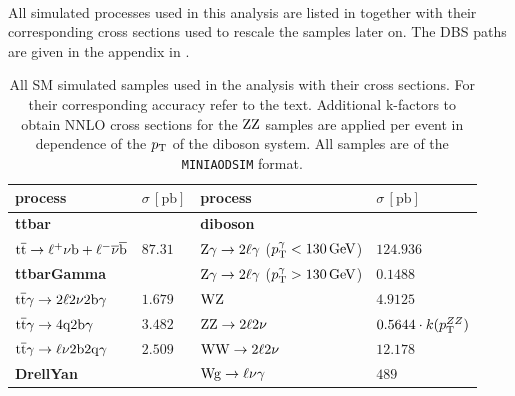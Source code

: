 \\
All simulated processes used in this analysis are listed in  together with their corresponding cross sections used to rescale the samples later on. The DBS paths are given in the appendix in .\\

\begin{table}[htb]
 \centering
 \caption{All SM simulated samples used in the analysis with their cross sections. For their corresponding accuracy refer to the text. Additional k-factors to obtain NNLO cross sections for the $\mathrm{Z}\mathrm{Z}$ samples are applied per event in dependence of the $p_{\mathrm{T}}$ of the diboson system. All samples are of the \texttt{MINIAODSIM} format.}
 \label{tab:MCsamples}
 \begin{tabular}[width=\textwidth]{ll|ll}
  \hline
  \normalsize{process}                             & \normalsize{$\sigma\,[\mathrm{pb}]$} & \normalsize{process}                         & \normalsize{$\sigma\,[\mathrm{pb}]$} \\\hline
  \scriptsize{\textbf{ttbar}}                      &                                      & \scriptsize{\textbf{diboson}}                &                                      \\
  ${\mathrm{t}\overline{\mathrm{t}}}\to\ell^{+}\nu\mathrm{b}+\ell^{-}\overline{\nu}\overline{\mathrm{b}}$ & $87.31$                              & $\mathrm{Z}\gamma\to2\ell\gamma$ ($p_{\mathrm{T}}^{\gamma}<130\,\text{Ge\hspace{-.08em}V}$) & $124.936$                            \\
  \scriptsize{\textbf{ttbarGamma}}                 &                                      & $\mathrm{Z}\gamma\to2\ell\gamma$ ($p_{\mathrm{T}}^{\gamma}>130\,\text{Ge\hspace{-.08em}V}$) & $0.1488$                             \\
  ${\mathrm{t}\overline{\mathrm{t}}}\gamma\to2\ell2\nu2\mathrm{b}\gamma$              & $1.679$                              & $\mathrm{W}\mathrm{Z}$                                     & $4.9125$                             \\
  ${\mathrm{t}\overline{\mathrm{t}}}\gamma\to4\mathrm{q}2\mathrm{b}\gamma$                   & $3.482$                              & $\mathrm{Z}\mathrm{Z}\to2\ell2\nu$                        & $0.5644\cdot k(p_{\mathrm{T}}^{ZZ})$            \\
  ${\mathrm{t}\overline{\mathrm{t}}}\gamma\to\ell\nu2\mathrm{b}2\mathrm{q}\gamma$           & $2.509$                              & $\mathrm{W}\mathrm{W}\to2\ell2\nu$                        & $12.178$                             \\
  \scriptsize{\textbf{DrellYan}}                   &                                      & $\mathrm{W}\mathrm{g}\to\ell\nu\gamma$                      & $489$                                \\

\end{tabular}
\end{table}
